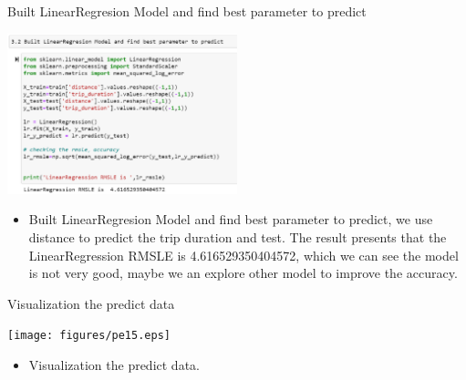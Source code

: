 \documentclass[
 size=14pt,
 paper=smartboard,  %
 mode=present, 		%
 display=slides, 	%
 style=tuliplab,  	%
 pauseslide,
 fleqn,leqno]{powerdot}
\begin{document}
\begin{slide}{Built LinearRegresion Model and find best parameter to predict }
	{\begin{flushleft}
		\includegraphics[width=0.5\textwidth]{figures/pe14.eps}
	\end{flushleft}
}
	
	\begin{itemize}
		\item
		\smallskip
		Built LinearRegresion Model and find best parameter to predict, we use distance to predict the trip duration and test. The result presents that the LinearRegression RMSLE is  4.616529350404572, which we can see the model is not very good, maybe we an explore other model to improve the accuracy. 
		
	\end{itemize}
	
\end{slide}


\begin{slide}{Visualization the predict data}
	{\begin{flushleft}
			\texttt{[image: figures/pe15.eps]}
		\end{flushleft}
	}
	
	\begin{itemize}
		\item
		\smallskip
		Visualization the predict data.
		
	\end{itemize}
	
\end{slide}



\end{document}
